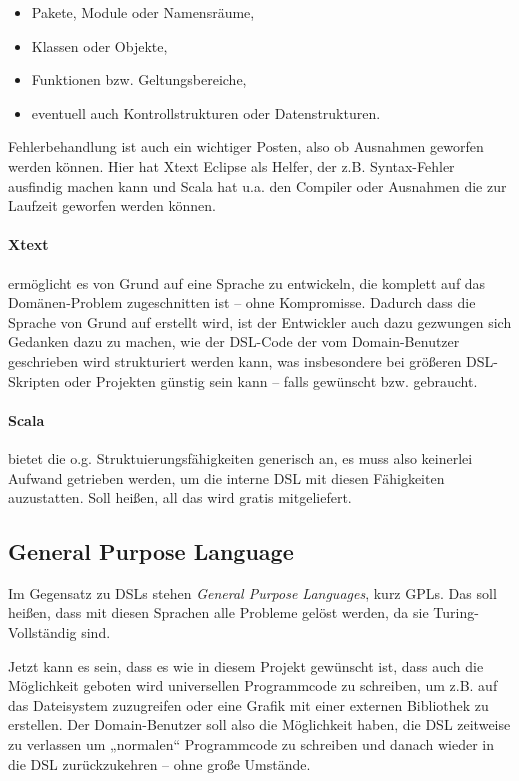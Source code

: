 \begin{itemize}
  \item Pakete, Module oder Namensräume,
  \item Klassen oder Objekte,
  \item Funktionen bzw. Geltungsbereiche,
  \item eventuell auch Kontrollstrukturen oder Datenstrukturen.
\end{itemize}

Fehlerbehandlung ist auch ein wichtiger Posten, also ob Ausnahmen
geworfen werden können. Hier hat Xtext Eclipse als Helfer, der
z.B. Syntax-Fehler ausfindig machen kann und Scala hat u.a. den Compiler
oder Ausnahmen die zur Laufzeit geworfen werden können.

\paragraph{Xtext} ermöglicht es von Grund auf eine Sprache zu entwickeln,
die komplett auf das Domänen-Problem zugeschnitten ist -- ohne Kompromisse.
Dadurch dass die Sprache von Grund auf erstellt wird, ist der Entwickler
auch dazu gezwungen sich Gedanken dazu zu machen, wie der DSL-Code
der vom Domain-Benutzer geschrieben wird strukturiert werden kann,
was insbesondere bei größeren DSL-Skripten oder
Projekten günstig sein kann -- falls gewünscht bzw. gebraucht.

\paragraph{Scala} bietet die o.g. Struktuierungsfähigkeiten generisch an,
es muss also keinerlei Aufwand getrieben werden, um die interne DSL mit
diesen Fähigkeiten auzustatten. Soll heißen, all das wird gratis mitgeliefert.


\subsection{General Purpose Language}\label{sec-gpl}

Im Gegensatz zu DSLs stehen \emph{General Purpose Languages}, kurz GPLs.
Das soll heißen, dass mit diesen Sprachen alle Probleme gelöst werden, da
sie Turing-Vollständig sind.

Jetzt kann es sein, dass es wie in diesem Projekt gewünscht ist, dass
auch die Möglichkeit geboten wird universellen Programmcode zu schreiben,
um z.B. auf das Dateisystem zuzugreifen oder eine Grafik mit einer
externen Bibliothek zu erstellen. Der Domain-Benutzer soll also die
Möglichkeit haben, die DSL zeitweise zu verlassen um „normalen“ Programmcode
zu schreiben und danach wieder in die DSL zurückzukehren -- ohne große
Umstände.

